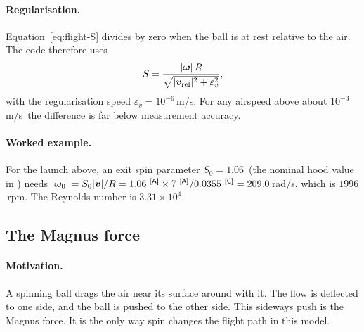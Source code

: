 \paragraph{Regularisation.}
Equation~\eqref{eq:flight-S} divides by zero when the ball is at rest relative to the air.
The code therefore uses
\begin{equation}
  S = \frac{|\bm{\omega}|\,R}{\sqrt{|\bm{v}_{\mathrm{rel}}|^2 + \varepsilon_v^2}},
  \label{eq:flight-S-reg}
\end{equation}
with the regularisation speed $\varepsilon_v = 10^{-6}$\,\unit{m/s}\assumed.
For any airspeed above about $10^{-3}$\,\unit{m/s}\assumed\ the difference is far below measurement accuracy.

\paragraph{Worked example.}
For the launch above, an exit spin parameter $S_0 = 1.06$\assumed\ (the nominal hood value in
) needs
$|\vect{\omega}_0| = S_0|\vect{v}|/R = 1.06\assumed\times 7\assumed/0.0355\confirmed = 209.0$\,\unit{rad/s}\derived,
which is $1996$\,\unit{rpm}\derived.
The Reynolds number is $3.31\times10^{4}$\derived.

\subsection{The Magnus force}
\label{sec:flight-magnus}

\paragraph{Motivation.}
A spinning ball drags the air near its surface around with it.
The flow is deflected to one side, and the ball is pushed to the other side.
This sideways push is the Magnus force.
It is the only way spin changes the flight path in this model.

